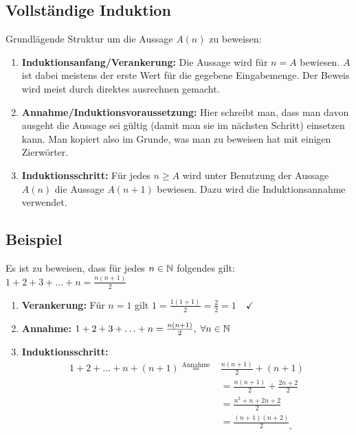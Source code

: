 \begin{multicols}{2}
\section{Vollständige Induktion}
Grundlägende Struktur um die Aussage $A(n)$ zu beweisen:
\begin{enumerate}
	\item \textbf{Induktionsanfang/Verankerung:} Die Aussage wird für $n = A$ bewiesen.
	$A$ ist dabei meistens der erste Wert für die gegebene Eingabemenge.
	Der Beweis wird meist durch direktes ausrechnen gemacht.
	\item \textbf{Annahme/Induktionsvoraussetzung:} Hier schreibt man,
	dass man davon ausgeht die Aussage sei gültig (damit man sie im nächsten Schritt)
	einsetzen kann. Man kopiert also im Grunde, was man zu beweisen hat mit einigen Zierwörter.
	\item \textbf{Induktionsschritt:} Für jedes $n \geq A$ wird unter Benutzung der Aussage $A(n)$
	die Aussage $A(n+1)$ bewiesen. Dazu wird die Induktionsannahme verwendet.
\end{enumerate}

\subsection{Beispiel}
Es ist zu beweisen, dass für jedes $n \in \mathbb{N}$ folgendes gilt: $1 + 2 + 3 + \ldots + n = \frac{n(n + 1)}{2}$
\begin{enumerate}
	\item \textbf{Verankerung:} Für $n = 1$ gilt $1 = \frac{1 (1 + 1)}{2} = \frac{2}{2} = 1 \quad \checkmark$ 
	\item \textbf{Annahme:} $1 + 2 + 3 + \ldots + n = \frac{n(n+1)}{2}, \; \forall n \in \mathbb{N}$
	\item \textbf{Induktionsschritt:}
	\begin{align*}
	1 + 2 + \ldots + n + (n+1) \overset{\text{Annahme}}{=} & \frac{n(n+1)}{2} + (n + 1)\\
	&= \frac{n(n+1)}{2} + \frac{2n + 2}{2} \\
	&= \frac{n^2 + n + 2n + 2}{2} \\
	&= \frac{(n + 1)(n + 2)}{2} _\square
	\end{align*}
\end{enumerate}
\end{multicols}